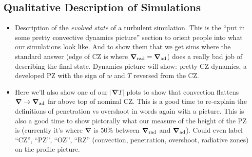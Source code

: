 \documentclass[12pt, fullpage]{article}
\renewcommand{\vec}[1]{\boldsymbol{#1}}
\newcommand{\grad}{\vec{\nabla}}
\begin{document}
\subsection{Qualitative Description of Simulations}
\begin{itemize}
\item Description of the \emph{evolved state} of a turbulent simulation.
This is the ``put in some pretty convective dynamics picture'' section to orient people into what our simulations look like.
And to show them that we get sims where the standard answer (edge of CZ is where $\grad_{\rm{rad}} = \grad_{\rm{ad}}$) does a really bad job of describing the final state.
Dynamics picture will show: pretty CZ dynamics, a developed PZ with the sign of $w$ and $T$ reversed from the CZ.
\item Here we'll also show one of our $|\grad T|$ plots to show that convection flattens $\grad \rightarrow \grad_{\rm{ad}}$ far above top of nominal CZ.
This is a good time to re-explain the definitions of penetration vs overshoot in words again with a picture.
This is also a good time to show pictorally what our measure of the height of the PZ is (currently it's where $\grad$ is 50\% between $\grad_{\rm{rad}}$ and $\grad_{\rm{ad}}$).
Could even label ``CZ'', ``PZ'', ``OZ'', ``RZ'' (convection, penetration, overshoot, radiative zones) on the profile picture.
\end{itemize}
\end{document}
